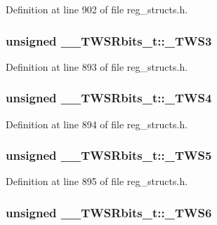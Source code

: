 Definition at line 902 of file reg\+\_\+structs.\+h.

\hypertarget{union_____t_w_s_rbits__t_a8115be1b7e8cdcc25482ae243c3b070a}{
\subsubsection[{\+\_\+\+T\+W\+S3}]{\setlength{\rightskip}{0pt plus 5cm}unsigned \+\_\+\+\_\+\+T\+W\+S\+Rbits\+\_\+t\+::\+\_\+\+T\+W\+S3}}\label{union_____t_w_s_rbits__t_a8115be1b7e8cdcc25482ae243c3b070a}


Definition at line 893 of file reg\+\_\+structs.\+h.

\hypertarget{union_____t_w_s_rbits__t_ace7166b90449f05c6f4f86643819d9cf}{
\subsubsection[{\+\_\+\+T\+W\+S4}]{\setlength{\rightskip}{0pt plus 5cm}unsigned \+\_\+\+\_\+\+T\+W\+S\+Rbits\+\_\+t\+::\+\_\+\+T\+W\+S4}}\label{union_____t_w_s_rbits__t_ace7166b90449f05c6f4f86643819d9cf}


Definition at line 894 of file reg\+\_\+structs.\+h.

\hypertarget{union_____t_w_s_rbits__t_ab34c2db57d3f428c4b2edc8afdba9af7}{
\subsubsection[{\+\_\+\+T\+W\+S5}]{\setlength{\rightskip}{0pt plus 5cm}unsigned \+\_\+\+\_\+\+T\+W\+S\+Rbits\+\_\+t\+::\+\_\+\+T\+W\+S5}}\label{union_____t_w_s_rbits__t_ab34c2db57d3f428c4b2edc8afdba9af7}


Definition at line 895 of file reg\+\_\+structs.\+h.

\hypertarget{union_____t_w_s_rbits__t_aced71bd4f6ed3e667e9d958ae808e1ec}{
\subsubsection[{\+\_\+\+T\+W\+S6}]{\setlength{\rightskip}{0pt plus 5cm}unsigned \+\_\+\+\_\+\+T\+W\+S\+Rbits\+\_\+t\+::\+\_\+\+T\+W\+S6}}\label{union_____t_w_s_rbits__t_aced71bd4f6ed3e667e9d958ae808e1ec}


